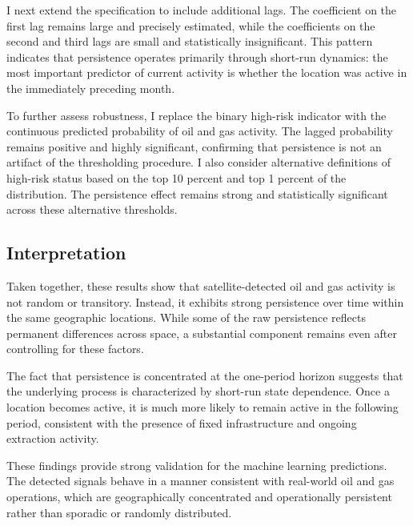 \documentclass[12pt]{article}
\begin{document}
I next extend the specification to include additional lags. The coefficient on the first lag remains large and precisely estimated, while the coefficients on the second and third lags are small and statistically insignificant. This pattern indicates that persistence operates primarily through short-run dynamics: the most important predictor of current activity is whether the location was active in the immediately preceding month.

To further assess robustness, I replace the binary high-risk indicator with the continuous predicted probability of oil and gas activity. The lagged probability remains positive and highly significant, confirming that persistence is not an artifact of the thresholding procedure. I also consider alternative definitions of high-risk status based on the top 10 percent and top 1 percent of the distribution. The persistence effect remains strong and statistically significant across these alternative thresholds.

\subsection{Interpretation}

Taken together, these results show that satellite-detected oil and gas activity is not random or transitory. Instead, it exhibits strong persistence over time within the same geographic locations. While some of the raw persistence reflects permanent differences across space, a substantial component remains even after controlling for these factors.

The fact that persistence is concentrated at the one-period horizon suggests that the underlying process is characterized by short-run state dependence. Once a location becomes active, it is much more likely to remain active in the following period, consistent with the presence of fixed infrastructure and ongoing extraction activity.

These findings provide strong validation for the machine learning predictions. The detected signals behave in a manner consistent with real-world oil and gas operations, which are geographically concentrated and operationally persistent rather than sporadic or randomly distributed.
\end{document}
